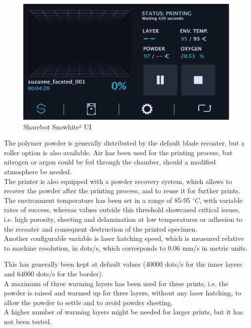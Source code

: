 \documentclass{article}
\begin{document}
          \begin{figure}[ht]
              \centering
              \includegraphics[width=\textwidth]{Pictures/Sharebot_GUI.pdf}
              \caption{Sharebot Snowhite² UI}
              \label{fig:Sharebot_UI}
          \end{figure}
  
          The polymer powder is generally distributed by the default blade recoater, but a roller option is also available. 
          Air has been used for the printing process, but nitrogen or argon could be fed through the chamber, 
          should a modified atmosphere be needed.  \\
  
          The printer is also equipped with a powder recovery system, which allows to recover the powder 
          after the printing process, and to reuse it for further prints. \\ 
  
          The environment temperature has been set in a range of 85-95 $^{\circ}C$, with variable rates of success, 
          whereas values outside this threshold showcased critical issues, i.e. high porosity, sheeting and 
          delamination at low temperatures or adhesion to the recoater and consequent destruction of the printed specimen. \\ 
  
          Another configurable variable is laser hatching speed, which is measured relative to machine resolution, in dots/s, 
          which corresponds to 0.06 mm/s in metric units. 
  
          This has generally been kept at default values (40000 dots/s for the inner layers and 64000 dots/s for the border).  \\ 
  
          A maximum of three warming layers has been used for these prints, i.e. the powder is raised and warmed 
          up for three layers, without any laser hatching, to allow the powder to settle and to avoid 
          powder sheeting. \\ 
          A higher number of warming layers might be needed for larger prints, but it has not been tested. \\
  
\end{document}

